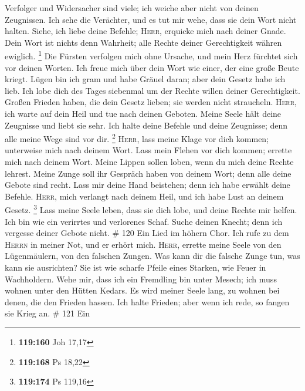 Verfolger und Widersacher sind viele; ich weiche aber nicht von deinen
Zeugnissen.  Ich sehe die Verächter, und es tut mir
wehe, dass sie dein Wort nicht halten.  Siehe, ich liebe
deine Befehle; \textsc{Herr}, erquicke mich nach deiner Gnade.
 Dein Wort ist nichts denn Wahrheit; alle Rechte deiner
Gerechtigkeit währen ewiglich. \footnote{\textbf{119:160} Joh 17,17}
 Die Fürsten verfolgen mich ohne Ursache, und mein Herz
fürchtet sich vor deinen Worten.  Ich freue mich über
dein Wort wie einer, der eine große Beute kriegt.  Lügen
bin ich gram und habe Gräuel daran; aber dein Gesetz habe ich lieb.
 Ich lobe dich des Tages siebenmal um der Rechte willen
deiner Gerechtigkeit.  Großen Frieden haben, die dein
Gesetz lieben; sie werden nicht straucheln. 
\textsc{Herr}, ich warte auf dein Heil und tue nach deinen Geboten.
 Meine Seele hält deine Zeugnisse und liebt sie sehr.
 Ich halte deine Befehle und deine Zeugnisse; denn alle
meine Wege sind vor dir. \footnote{\textbf{119:168} Ps 18,22}
 \textsc{Herr}, lass meine Klage vor dich kommen;
unterweise mich nach deinem Wort.  Lass mein Flehen vor
dich kommen; errette mich nach deinem Wort.  Meine
Lippen sollen loben, wenn du mich deine Rechte lehrest. 
Meine Zunge soll ihr Gespräch haben von deinem Wort; denn alle deine
Gebote sind recht.  Lass mir deine Hand beistehen; denn
ich habe erwählt deine Befehle.  \textsc{Herr}, mich
verlangt nach deinem Heil, und ich habe Lust an deinem Gesetz.
\footnote{\textbf{119:174} Ps 119,16}  Lass meine Seele
leben, dass sie dich lobe, und deine Rechte mir helfen. 
Ich bin wie ein verirrtes und verlorenes Schaf. Suche deinen Knecht;
denn ich vergesse deiner Gebote nicht. \# 120  Ein Lied im
höhern Chor. Ich rufe zu dem \textsc{Herrn} in meiner Not, und er erhört
mich.  \textsc{Herr}, errette meine Seele von den
Lügenmäulern, von den falschen Zungen.  Was kann dir die
falsche Zunge tun, was kann sie ausrichten?  Sie ist wie
scharfe Pfeile eines Starken, wie Feuer in Wachholdern. 
Wehe mir, dass ich ein Fremdling bin unter Mesech; ich muss wohnen unter
den Hütten Kedars.  Es wird meiner Seele lang, zu wohnen
bei denen, die den Frieden hassen.  Ich halte Frieden;
aber wenn ich rede, so fangen sie Krieg an. \# 121  Ein
